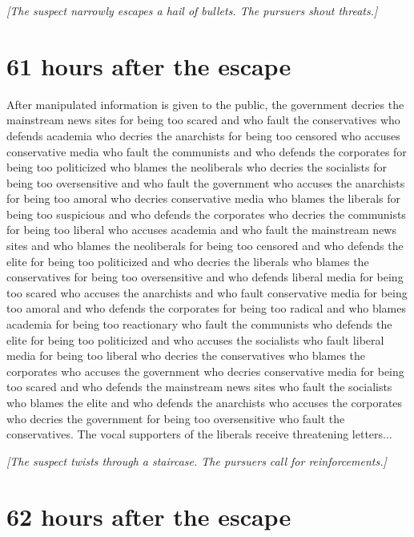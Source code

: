 \documentclass{report}
\begin{document}
\textit{[The suspect narrowly escapes a hail of bullets. The pursuers shout threats.]}


\section*{61 \small{hours after the escape}}

After manipulated information is given to the public, the government decries the mainstream news sites for being too scared and who fault the conservatives who defends academia who decries the anarchists for being too censored who accuses conservative media who fault the communists and who defends the corporates for being too politicized who blames the neoliberals who decries the socialists for being too oversensitive and who fault the government who accuses the anarchists for being too amoral who decries conservative media who blames the liberals for being too suspicious and who defends the corporates who decries the communists for being too liberal who accuses academia and who fault the mainstream news sites and who blames the neoliberals for being too censored and who defends the elite for being too politicized and who decries the liberals who blames the conservatives for being too oversensitive and who defends liberal media for being too scared who accuses the anarchists and who fault conservative media for being too amoral and who defends the corporates for being too radical and who blames academia for being too reactionary who fault the communists who defends the elite for being too politicized and who accuses the socialists who fault liberal media for being too liberal who decries the conservatives who blames the corporates who accuses the government who decries conservative media for being too scared and who defends the mainstream news sites who fault the socialists who blames the elite and who defends the anarchists who accuses the corporates who decries the government for being too oversensitive who fault the conservatives. The vocal supporters of the liberals receive threatening letters...

\textit{[The suspect twists through a staircase. The pursuers call for reinforcements.]}


\section*{62 \small{hours after the escape}}
\end{document}
